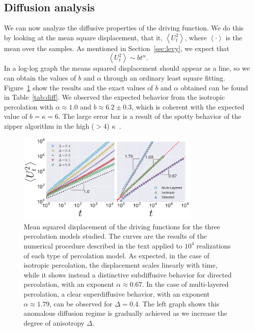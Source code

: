 \subsection{Diffusion analysis}
\label{sec:dif}

We can now analyze the diffusive properties of the driving function. We do this
by looking at the mean square displacement, that it, $\left\langle U_t^2
\right\rangle$, where $\left\langle\cdot\right\rangle$ is the mean over the
samples. As mentioned in Section~\ref{sec:levy}, we expect that
\begin{equation}
    \left\langle U_t^2 \right\rangle\sim bt^\alpha.
\end{equation}
In a log-log graph the means squared displacement should appear as a line, so
we can obtain the values of $b$ and $\alpha$ through an ordinary least square
fitting. Figure~\ref{fig:diffusion} show the results and the exact values of
$b$ and $\alpha$ obtained can be found in Table~\ref{tab:diff}. We observed the
expected behavior from the isotropic percolation with $\alpha\approx1.0$ and
$b\approx6.2\pm0.3$, which is coherent with the expected value of $b=\kappa=6$.
The large error bar is a result of the spotty behavior of the zipper algorithm
in the high ($>4$) $\kappa$~\cite{Kennedy2007}.

\begin{figure}[b]
\begin{center}
    \includegraphics[width=0.8\textwidth]{chapters/ch6-asle/figs/diffusion}
\end{center}
\caption{Mean squared displacement of the driving functions for the three
    percolation models studied. The curves are the results of the numerical
    procedure described in the text applied to $10^4$ realizations of each type
    of percolation model. As expected, in the case of isotropic percolation,
    the displacement scales linearly with time, while it shows instead a
    distinctive subdiffusive behavior for directed percolation, with an
    exponent $\alpha\approx0.67$. In the case of multi-layered percolation, a
    clear superdiffusive behavior, with an exponent $\alpha\approx1.79$, can be
    observed for $\Delta=0.4$. The left graph shows this anomalous diffusion
    regime is gradually achieved as we increase the degree of anisotropy
    $\Delta$.}
\label{fig:diffusion}
\end{figure}

